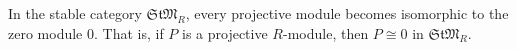 In the stable category $\mathfrak{StM}_R$, every projective module becomes isomorphic to the zero module $0$. That is, if $P$ is a projective $R$-module, then $P \cong 0$ in $\mathfrak{StM}_R$.
